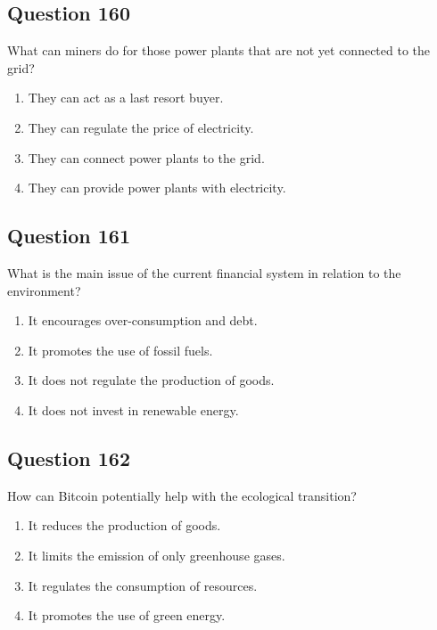 \documentclass[12pt,a4paper]{article}
\begin{document}
\bigskip


\subsection*{Question 160}
What can miners do for those power plants that are not yet connected to the grid?

\begin{enumerate}[label=\Alph*., leftmargin=*]
\item They can act as a last resort buyer.
\item They can regulate the price of electricity.
\item They can connect power plants to the grid.
\item They can provide power plants with electricity.
\end{enumerate}

\bigskip


\subsection*{Question 161}
What is the main issue of the current financial system in relation to the environment?

\begin{enumerate}[label=\Alph*., leftmargin=*]
\item It encourages over-consumption and debt.
\item It promotes the use of fossil fuels.
\item It does not regulate the production of goods.
\item It does not invest in renewable energy.
\end{enumerate}

\bigskip


\subsection*{Question 162}
How can Bitcoin potentially help with the ecological transition?

\begin{enumerate}[label=\Alph*., leftmargin=*]
\item It reduces the production of goods.
\item It limits the emission of only greenhouse gases.
\item It regulates the consumption of resources.
\item It promotes the use of green energy.
\end{enumerate}
\end{document}
